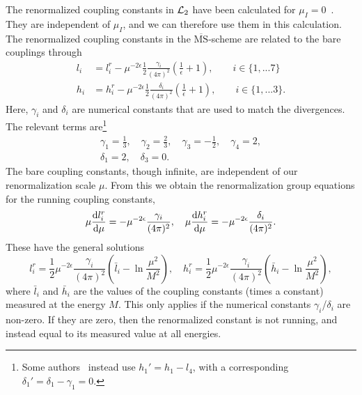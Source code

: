 The renormalized coupling constants in $\mathcal{L}_2$ have been calculated for $\mu_I = 0$~\cite{Gasser-Leutwyler:chiral}.
They are independent of $\mu_I$, and we can therefore use them in this calculation.
The renormalized coupling constants in the $\overline{\mathrm{MS}}$-scheme are related to the bare couplings through
\begin{align}
    l_i 
    & = 
    l_i^r 
    - \mu^{-2\epsilon}\frac{1}{2} \frac{\gamma_i }{(4 \pi)^2} 
    \left(\frac{1}{\epsilon} + 1 \right),
    \quad \quad
    i \in \{1, ... 7\} 
    \\
    h_i 
    & = 
    h_i^r
    - \mu^{-2\epsilon} \frac{1}{2}  \frac{\delta_i }{(4 \pi)^2} 
    \left(\frac{1}{\epsilon} + 1 \right), 
    \quad \quad
    i \in \{1, ... 3\}.
\end{align}
Here, $\gamma_i$ and $\delta_i$ are numerical constants that are used to match the divergences.
The relevant terms are\footnote{Some authors~\cite{Andersen:two-flavor-chpt,GERBER1989387} instead use $h_1' = h_1 - l_4$, with a corresponding $\delta_1' = \delta_1 - \gamma_1 = 0$.}
\begin{gather}
    \gamma_1 = \frac{1}{3}, \quad
    \gamma_2 = \frac{2}{3}, \quad
    \gamma_3 = - \frac{1}{2}, \quad
    \gamma_4 = 2, \\
    \delta_1 = 2, \quad
    \delta_3 = 0.
\end{gather}
The bare coupling constants, though infinite, are independent of our renormalization scale $\mu$.
From this we obtain the renormalization group equations for the running coupling constants,
\begin{equation}
    \mu \diff{l_i^r}{\mu } = - \mu^{-2\epsilon} \frac{\gamma_i }{(4 \pi)^2}, \quad
    \mu \diff{h_i^r}{\mu } = -  \mu^{-2\epsilon}\frac{\delta_i}{(4 \pi)^2}.
\end{equation}
These have the general solutions
\begin{equation}
    l_i^r 
    = \frac{1}{2} \mu^{-2\epsilon} \frac{\gamma_i}{(4 \pi)^2} 
    \left( \bar l_i - \ln{\frac{\mu^2}{M^2}} \right),
    \quad
    h_i^r 
    = \frac{1}{2} \mu^{-2\epsilon} \frac{\gamma_i}{(4 \pi)^2} 
    \left( \bar h_i - \ln{\frac{\mu^2}{M^2}} \right),
\end{equation}
where $\bar l_i$ and $\bar h_i$ are the values of the coupling constants (times a constant) measured at the energy $M$.
This only applies if the numerical constants $\gamma_i$/$\delta_i$ are non-zero.
If they are zero, then the renormalized constant is not running, and instead equal to its measured value at all energies.
